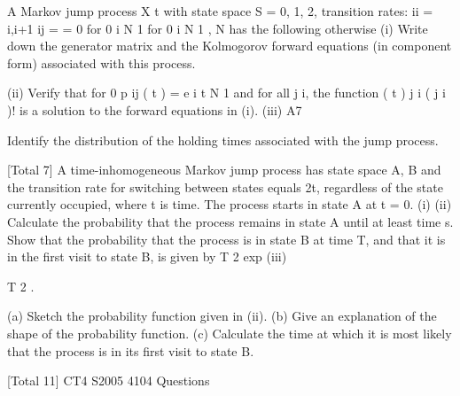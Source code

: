 \documentclass[a4paper,12pt]{article}
\begin{document}
\begin{enumerate}

A Markov jump process X t with state space S = {0, 1, 2,
transition rates:
ii
=
i,i+1
ij
=
= 0
for 0 i N 1
for 0 i N 1
, N} has the following
otherwise
(i) Write down the generator matrix and the Kolmogorov forward equations (in
component form) associated with this process.

(ii) Verify that for 0
p ij ( t ) = e
i
t
N
1 and for all j
i, the function
( t ) j i
( j i )!
is a solution to the forward equations in (i).
(iii)
A7

Identify the distribution of the holding times associated with the jump process.

[Total 7]
A time-inhomogeneous Markov jump process has state space {A, B} and the
transition rate for switching between states equals 2t, regardless of the state currently
occupied, where t is time.
The process starts in state A at t = 0.
(i)
(ii)
Calculate the probability that the process remains in state A until at least
time s.
Show that the probability that the process is in state B at time T, and that it is
in the first visit to state B, is given by T 2 exp
(iii)

T 2
.

(a) Sketch the probability function given in (ii).
(b) Give an explanation of the shape of the probability function.
(c) Calculate the time at which it is most likely that the process is in its
first visit to state B.

[Total 11]
CT4 S2005
4104 Questions




\end{enumerate}
\end{document}
